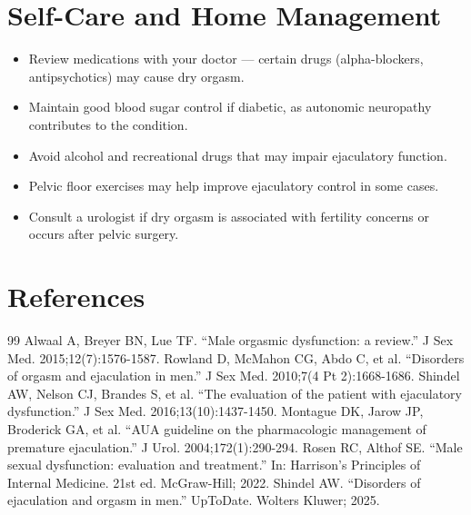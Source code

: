 \section*{Self-Care and Home Management}
\begin{itemize}
  \item Review medications with your doctor — certain drugs (alpha-blockers, antipsychotics) may cause dry orgasm.
  \item Maintain good blood sugar control if diabetic, as autonomic neuropathy contributes to the condition.
  \item Avoid alcohol and recreational drugs that may impair ejaculatory function.
  \item Pelvic floor exercises may help improve ejaculatory control in some cases.
  \item Consult a urologist if dry orgasm is associated with fertility concerns or occurs after pelvic surgery.
\end{itemize}

\section*{References}
\begin{thebibliography}{99}
 Alwaal A, Breyer BN, Lue TF. ``Male orgasmic dysfunction: a review.'' J Sex Med. 2015;12(7):1576-1587.
 Rowland D, McMahon CG, Abdo C, et al. ``Disorders of orgasm and ejaculation in men.'' J Sex Med. 2010;7(4 Pt 2):1668-1686.
 Shindel AW, Nelson CJ, Brandes S, et al. ``The evaluation of the patient with ejaculatory dysfunction.'' J Sex Med. 2016;13(10):1437-1450.
 Montague DK, Jarow JP, Broderick GA, et al. ``AUA guideline on the pharmacologic management of premature ejaculation.'' J Urol. 2004;172(1):290-294.
 Rosen RC, Althof SE. ``Male sexual dysfunction: evaluation and treatment.'' In: Harrison's Principles of Internal Medicine. 21st ed. McGraw-Hill; 2022.
 Shindel AW. ``Disorders of ejaculation and orgasm in men.'' UpToDate. Wolters Kluwer; 2025.
\end{thebibliography}
